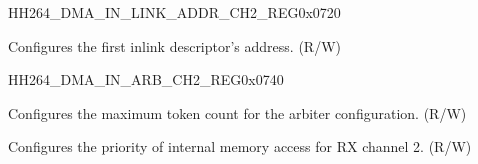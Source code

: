\begin{register}{H}{H264\_DMA\_IN\_LINK\_ADDR\_CH2\_REG}{0x0720}\label{regdesc:H264DMAINLINKADDRCH2REG}
%
\regnewline%
\begin{regdesc}\begin{reglist}
\label{fielddesc:H264DMAINLINKADDRCH2}\item [H264\_DMA\_INLINK\_ADDR\_CH2] Configures the first inlink descriptor's address. (R/W)
\end{reglist}\end{regdesc}
\end{register}


\begin{register}{H}{H264\_DMA\_IN\_ARB\_CH2\_REG}{0x0740}\label{regdesc:H264DMAINARBCH2REG}
%
%
%
%
\regnewline%
\begin{regdesc}\begin{reglist}
\label{fielddesc:H264DMAINARBTOKENNUMCH2}\item [H264\_DMA\_IN\_ARB\_TOKEN\_NUM\_CH2] Configures the maximum token count for the arbiter configuration. (R/W)
\label{fielddesc:H264DMAINTERINARBPRIORITYCH2}\item [H264\_DMA\_INTER\_IN\_ARB\_PRIORITY\_CH2] Configures the priority of internal memory access for RX channel 2. (R/W)
\end{reglist}\end{regdesc}
\end{register}



